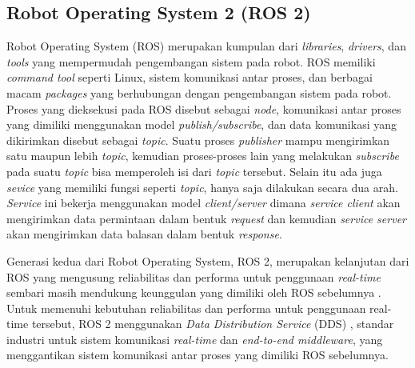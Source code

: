 
\subsection{Robot Operating System 2 (ROS 2)}
\label{subsec:ros2}

Robot Operating System (ROS) \citep{quigley2009} merupakan kumpulan dari \emph{libraries}, \emph{drivers}, dan \emph{tools} yang mempermudah pengembangan sistem pada robot.
ROS memiliki \emph{command tool} seperti Linux, sistem komunikasi antar proses, dan berbagai macam \emph{packages} yang berhubungan dengan pengembangan sistem pada robot.
Proses yang dieksekusi pada ROS disebut sebagai \emph{node}, komunikasi antar proses yang dimiliki menggunakan model \emph{publish/subscribe}, dan data komunikasi yang dikirimkan disebut sebagai \emph{topic}.
Suatu proses \emph{publisher} mampu mengirimkan satu maupun lebih \emph{topic}, kemudian proses-proses lain yang melakukan \emph{subscribe} pada suatu \emph{topic} bisa memperoleh isi dari \emph{topic} tersebut.
Selain itu ada juga \emph{sevice} yang memiliki fungsi seperti \emph{topic}, hanya saja dilakukan secara dua arah.
\emph{Service} ini bekerja menggunakan model \emph{client/server} dimana \emph{service client} akan mengirimkan data permintaan dalam bentuk \emph{request} dan kemudian \emph{service server} akan mengirimkan data balasan dalam bentuk \emph{response}.

Generasi kedua dari Robot Operating System, ROS 2, merupakan kelanjutan dari ROS yang mengusung reliabilitas dan performa untuk penggunaan \emph{real-time} sembari masih mendukung keunggulan yang dimiliki oleh ROS sebelumnya \citep{maruyama2016}.
Untuk memenuhi kebutuhan reliabilitas dan performa untuk penggunaan real-time tersebut, ROS 2 menggunakan \emph{Data Distribution Service} (DDS) \citep{castellote2003} \citep{schlesselman2004}, standar industri untuk sistem komunikasi \emph{real-time} dan \emph{end-to-end middleware}, yang menggantikan sistem komunikasi antar proses yang dimiliki ROS sebelumnya.

